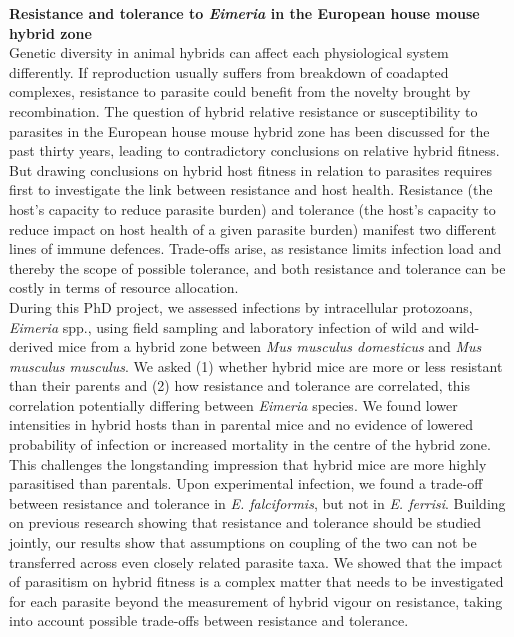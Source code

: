 \textbf{Resistance and tolerance to \textit{Eimeria} in the European house mouse hybrid zone} \\

Genetic diversity in animal hybrids can affect each physiological system differently. If reproduction usually suffers from breakdown of coadapted complexes, resistance to parasite could benefit from the novelty brought by recombination. The question of hybrid relative resistance or susceptibility to parasites in the European house mouse hybrid zone has been discussed for the past thirty years, leading to contradictory conclusions on relative hybrid fitness. But drawing conclusions on hybrid host fitness in relation to parasites requires first to investigate the link between resistance and host health. Resistance (the host’s capacity to reduce parasite burden) and tolerance (the host’s capacity to reduce impact on host health of a given parasite burden) manifest two different lines of immune defences. Trade-offs arise, as resistance limits infection load and thereby the scope of possible tolerance, and both resistance and tolerance can be costly in terms of resource allocation. \\
During this PhD project, we assessed infections by intracellular protozoans, \textit{Eimeria} spp., using field sampling and laboratory infection of wild and wild-derived mice from a hybrid zone between \textit{Mus musculus domesticus} and \textit{Mus musculus musculus}. We asked (1) whether hybrid mice are more or less resistant than their parents and (2) how resistance and tolerance are correlated, this correlation potentially differing between \textit{Eimeria} species. We found lower intensities in hybrid hosts than in parental mice and no evidence of lowered probability of infection or increased mortality in the centre of the hybrid zone. This challenges the longstanding impression that hybrid mice are more highly parasitised than parentals. Upon experimental infection, we found a trade-off between resistance and tolerance in \textit{E. falciformis}, but not in \textit{E. ferrisi}. Building on previous research showing that resistance and tolerance should be studied jointly, our results show that assumptions on coupling of the two can not be transferred across even closely related parasite taxa. We showed that the impact of parasitism on hybrid fitness is a complex matter that needs to be investigated for each parasite beyond the measurement of hybrid vigour on resistance, taking into account possible trade-offs between resistance and tolerance.
